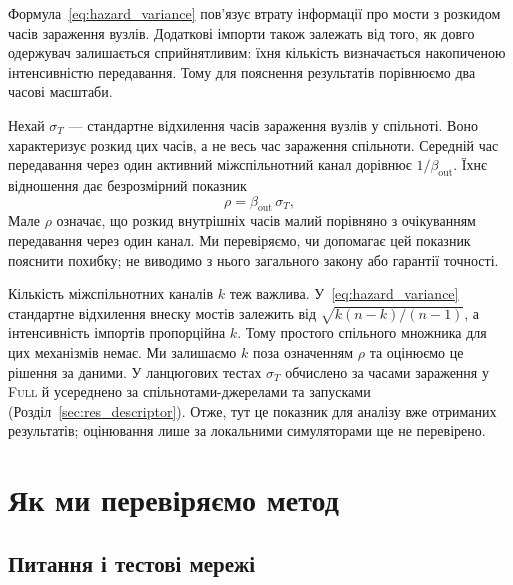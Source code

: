 \documentclass[a4paper,fleqn]{cas-sc}
\newcommand{\Full}{\textup{\textsc{Full}}}
\begin{document}
Формула~\eqref{eq:hazard_variance} пов'язує втрату інформації про мости з розкидом часів зараження вузлів. Додаткові імпорти також залежать від того, як довго одержувач залишається сприйнятливим: їхня кількість визначається накопиченою інтенсивністю передавання. Тому для пояснення результатів порівнюємо два часові масштаби.
\par Нехай $\sigma_T$ --- стандартне відхилення часів зараження вузлів у спільноті. Воно характеризує розкид цих часів, а не весь час зараження спільноти. Середній час передавання через один активний міжспільнотний канал дорівнює $1/\beta_{\mathrm{out}}$. Їхнє відношення дає безрозмірний показник
\begin{equation}
\label{eq:rho}
\rho=\beta_{\mathrm{out}}\,\sigma_T,
\end{equation}
Мале $\rho$ означає, що розкид внутрішніх часів малий порівняно з очікуванням передавання через один канал. Ми перевіряємо, чи допомагає цей показник пояснити похибку; не виводимо з нього загального закону або гарантії точності.
\par Кількість міжспільнотних каналів $k$ теж важлива. У~\eqref{eq:hazard_variance} стандартне відхилення внеску мостів залежить від $\sqrt{k(n-k)/(n-1)}$, а інтенсивність імпортів пропорційна $k$. Тому простого спільного множника для цих механізмів немає. Ми залишаємо $k$ поза означенням $\rho$ та оцінюємо це рішення за даними. У ланцюгових тестах $\sigma_T$ обчислено за часами зараження у \Full{} й усереднено за спільнотами-джерелами та запусками (Розділ~\ref*{sec:res_descriptor}). Отже, тут це показник для аналізу вже отриманих результатів; оцінювання лише за локальними симуляторами ще не перевірено.

\section{Як ми перевіряємо метод}
\label{sec:design}

\subsection{Питання і тестові мережі}
\end{document}

